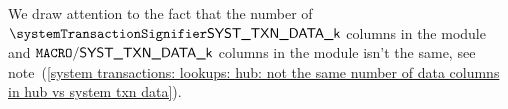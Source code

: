 \saNote{}
We draw attention to the fact that the number of
$\systemTxnDataCol{k}$ columns in the \hubMod{} module and
$\texttt{MACRO}\textsf{/}{\textsf{\textsf{SYST\_TXN\_DATA\_k}}}$ columns in the \txnSystemDataMod{} module
isn't the same,
see note~(\ref{system transactions: lookups: hub: not the same number of data columns in hub vs system txn data}).
